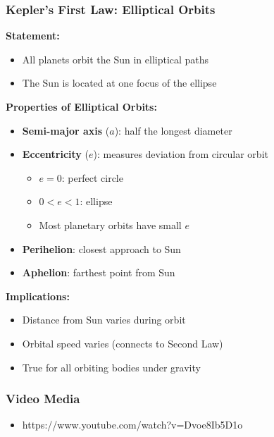 \documentclass{beamer}
\begin{document}
\begin{frame}
\frametitle{Kepler's First Law: Elliptical Orbits}

\textbf{Statement:}
\begin{itemize}
    \item All planets orbit the Sun in elliptical paths
    \item The Sun is located at one focus of the ellipse
\end{itemize}

\textbf{Properties of Elliptical Orbits:}
\begin{itemize}
    \item \textbf{Semi-major axis} ($a$): half the longest diameter
    \item \textbf{Eccentricity} ($e$): measures deviation from circular orbit
    \begin{itemize}
        \item $e = 0$: perfect circle
        \item $0 < e < 1$: ellipse
        \item Most planetary orbits have small $e$
    \end{itemize}
    \item \textbf{Perihelion}: closest approach to Sun
    \item \textbf{Aphelion}: farthest point from Sun
\end{itemize}

\textbf{Implications:}
\begin{itemize}
    \item Distance from Sun varies during orbit
    \item Orbital speed varies (connects to Second Law)
    \item True for all orbiting bodies under gravity
\end{itemize}

\end{frame}

\begin{frame}
\frametitle{Video Media}
\begin{itemize}
 \item https://www.youtube.com/watch?v=Dvoe8Ib5D1o
\end{itemize}
\end{frame}
\end{document}
